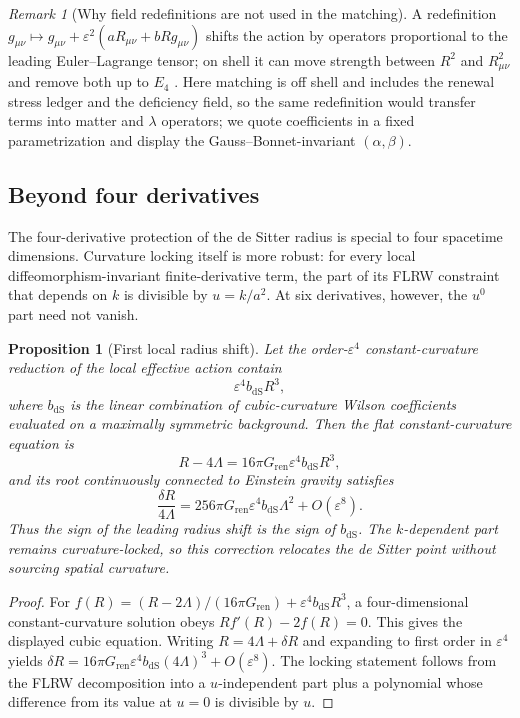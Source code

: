 \documentclass[11pt]{article}
\newtheorem{proposition}[theorem]{Proposition}
\theoremstyle{definition}
\theoremstyle{remark}
\newtheorem{remark}[theorem]{Remark}
\newcommand{\eps}{\varepsilon}
\newcommand{\dS}{\mathrm{dS}}
\newcommand{\Gren}{G_{\mathrm{ren}}}
\begin{document}
\begin{remark}[Why field redefinitions are not used in the matching]
\label{rem:field-redefinitions}
A redefinition $g_{\mu\nu}\mapsto g_{\mu\nu}+\eps^2(aR_{\mu\nu}+bRg_{\mu\nu})$ shifts
the action by operators proportional to the leading Euler--Lagrange tensor; on shell
it can move strength between $R^2$ and $R_{\mu\nu}^2$ and remove both up to $E_4$
\cite{Stelle1977,Donoghue1994}.  Here matching is off shell and includes the renewal
stress ledger and the deficiency field, so the same redefinition would transfer
terms into matter and $\lambda$ operators; we quote coefficients in a fixed
parametrization and display the Gauss--Bonnet-invariant $(\alpha,\beta)$.
\end{remark}

\subsection{Beyond four derivatives}
\label{subsec:six-derivative-radius-shift}

The four-derivative protection of the de Sitter radius is special to four
spacetime dimensions.  Curvature locking itself is more robust: for every
local diffeomorphism-invariant finite-derivative term, the part of its FLRW
constraint that depends on $k$ is divisible by $u=k/a^2$.  At six derivatives,
however, the $u^0$ part need not vanish.

\begin{proposition}[First local radius shift]
\label{prop:six-derivative-radius-shift}
Let the order-$\eps^4$ constant-curvature reduction of the local effective
action contain
\[
 \eps^4 b_{\dS}R^3,
\]
where $b_{\dS}$ is the linear combination of cubic-curvature Wilson
coefficients evaluated on a maximally symmetric background.  Then the flat
constant-curvature equation is
\[
 R-4\Lambda=16\pi\Gren\eps^4b_{\dS}R^3,
\]
and its root continuously connected to Einstein gravity satisfies
\[
 \frac{\delta R}{4\Lambda}
 =256\pi\Gren\eps^4b_{\dS}\Lambda^2+O(\eps^8).
\]
Thus the sign of the leading radius shift is the sign of $b_{\dS}$.  The
$k$-dependent part remains curvature-locked, so this correction relocates the
de Sitter point without sourcing spatial curvature.
\end{proposition}

\begin{proof}
For
$f(R)=(R-2\Lambda)/(16\pi\Gren)+\eps^4b_{\dS}R^3$, a four-dimensional
constant-curvature solution obeys $Rf'(R)-2f(R)=0$.  This gives the displayed
cubic equation.  Writing $R=4\Lambda+\delta R$ and expanding to first order in
$\eps^4$ yields
$\delta R=16\pi\Gren\eps^4b_{\dS}(4\Lambda)^3+O(\eps^8)$.
The locking statement follows from the FLRW decomposition into a
$u$-independent part plus a polynomial whose difference from its value at
$u=0$ is divisible by $u$.
\end{proof}
\end{document}

